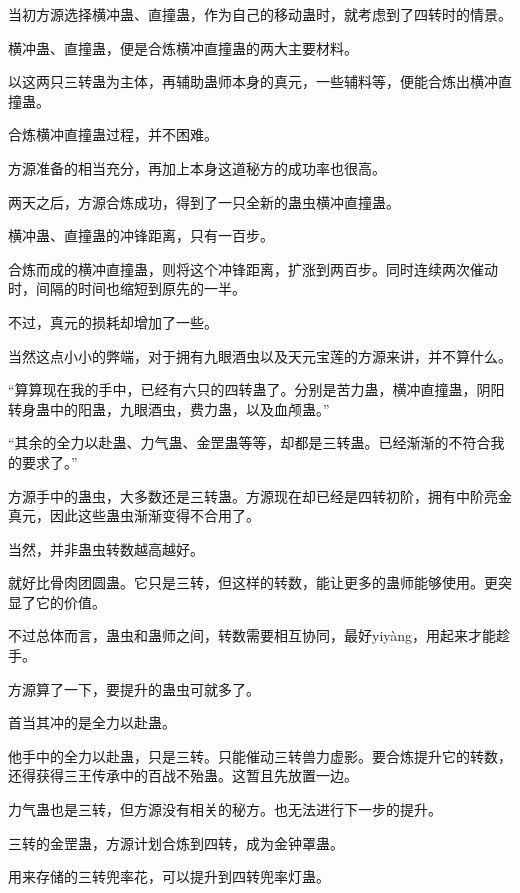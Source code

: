 
\begin{this_body}

当初方源选择横冲蛊、直撞蛊，作为自己的移动蛊时，就考虑到了四转时的情景。

横冲蛊、直撞蛊，便是合炼横冲直撞蛊的两大主要材料。

以这两只三转蛊为主体，再辅助蛊师本身的真元，一些辅料等，便能合炼出横冲直撞蛊。

合炼横冲直撞蛊过程，并不困难。

方源准备的相当充分，再加上本身这道秘方的成功率也很高。

两天之后，方源合炼成功，得到了一只全新的蛊虫横冲直撞蛊。

横冲蛊、直撞蛊的冲锋距离，只有一百步。

合炼而成的横冲直撞蛊，则将这个冲锋距离，扩涨到两百步。同时连续两次催动时，间隔的时间也缩短到原先的一半。

不过，真元的损耗却增加了一些。

当然这点小小的弊端，对于拥有九眼酒虫以及天元宝莲的方源来讲，并不算什么。

“算算现在我的手中，已经有六只的四转蛊了。分别是苦力蛊，横冲直撞蛊，阴阳转身蛊中的阳蛊，九眼酒虫，费力蛊，以及血颅蛊。”

“其余的全力以赴蛊、力气蛊、金罡蛊等等，却都是三转蛊。已经渐渐的不符合我的要求了。”

方源手中的蛊虫，大多数还是三转蛊。方源现在却已经是四转初阶，拥有中阶亮金真元，因此这些蛊虫渐渐变得不合用了。

当然，并非蛊虫转数越高越好。

就好比骨肉团圆蛊。它只是三转，但这样的转数，能让更多的蛊师能够使用。更突显了它的价值。

不过总体而言，蛊虫和蛊师之间，转数需要相互协同，最好yiyàng，用起来才能趁手。

方源算了一下，要提升的蛊虫可就多了。

首当其冲的是全力以赴蛊。

他手中的全力以赴蛊，只是三转。只能催动三转兽力虚影。要合炼提升它的转数，还得获得三王传承中的百战不殆蛊。这暂且先放置一边。

力气蛊也是三转，但方源没有相关的秘方。也无法进行下一步的提升。

三转的金罡蛊，方源计划合炼到四转，成为金钟罩蛊。

用来存储的三转兜率花，可以提升到四转兜率灯蛊。


\end{this_body}
